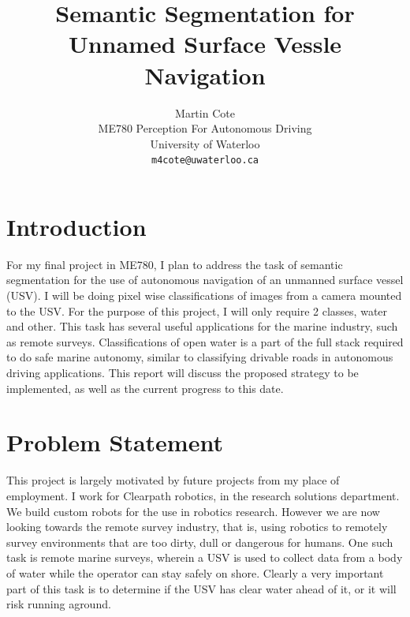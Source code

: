 \documentclass[10pt,twocolumn,letterpaper]{article}
\begin{document}
\title{ Semantic Segmentation for Unnamed Surface Vessle Navigation}

\author{Martin Cote\\
ME780 Perception For Autonomous Driving\\
University of Waterloo\\
{\tt\small m4cote@uwaterloo.ca}
}

\maketitle


\section{Introduction}
For my final project in ME780, I plan to address the task of semantic segmentation
for the use of autonomous navigation of an unmanned surface vessel (USV). I will be 
doing pixel wise classifications of images from a camera mounted to the USV. For the
purpose of this project, I will only require 2 classes, water and other. This task
has several useful applications for the marine industry, such as remote surveys. Classifications
of open water is a part of the full stack required to do safe marine autonomy,
similar to classifying drivable roads in autonomous driving applications. This report
will discuss the proposed strategy to be implemented, as well as the current progress 
to this date.


\section{Problem Statement }
This project is largely motivated by future projects from my place of employment.
I work for Clearpath robotics, in the research solutions department. We build 
custom robots for the use in robotics research. However we are now looking
towards the remote survey industry, that is, using robotics to remotely survey
environments that are too dirty, dull or dangerous for humans. One such task is 
remote marine surveys, wherein a USV is used to collect data from a body of water
while the operator can stay safely on shore. Clearly a very important part of this
task is to determine if the USV has clear water ahead of it, or it will risk 
running aground.
\end{document}
